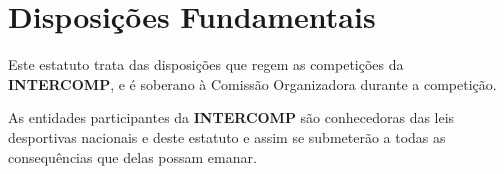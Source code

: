 \chapter{Disposições Fundamentais}

\begin{article}
	Este estatuto trata das disposições que regem as competições da \textbf{INTERCOMP}, e é soberano à Comissão Organizadora durante a competição.
\end{article}

\begin{article}
	As entidades participantes da \textbf{INTERCOMP} são conhecedoras das leis desportivas nacionais e deste estatuto e assim se submeterão a todas as consequências que delas possam emanar.
\end{article}

